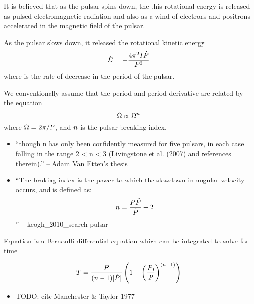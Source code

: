 It is believed that as the pulsar spins down, the this rotational energy
is released as pulsed electromagnetic radiation and also as a wind of
electrons and positrons accelerated in the magnetic field of the pulsar.

As the pulsar slows down, it released the rotational kinetic energy
\begin{equation}
  \dot{E} = - \frac{4 \pi^2 I \dot{P}}{P^3}
\end{equation}
where \perioddot is the rate of decrease in the period of the pulsar.


We conventionally assume that the period and period derivative are related
by the equation
\begin{equation}\eqnlabel{angular_frequency_derivative_relation}
  \angularfrequencydot \propto \angularfrequency^\breakingindex
\end{equation}
where $\Omega=2\pi/P$, and $n$
is the pulsar breaking index. 

\begin{itemize}
  \item ``though n has only been confidently measured for five pulsars,
  in each case falling in the range 2 < n < 3 (Livingstone et al. (2007)
  and references therein).'' -- Adam Van Etten's thesis
\item ``The braking index is the power to which the slowdown in angular
velocity occurs, and is defined as:
  \begin{equation}
    n = \frac{P \ddot{P}}{\dot{P}} + 2
  \end{equation}
  '' -- keogh\_2010\_search-pulsar
\end{itemize}

Equation  is
a Bernoulli differential equation which can be integrated to solve for time

\begin{equation}
  T = \frac{P}{(n-1) |\dot{P}|}
  \left(
  1-\left(\frac{P_0}{P}\right)^{(n-1)}
  \right)
\end{equation}

\begin{itemize}
  \item TODO: cite Manchester \& Taylor 1977
\end{itemize}



